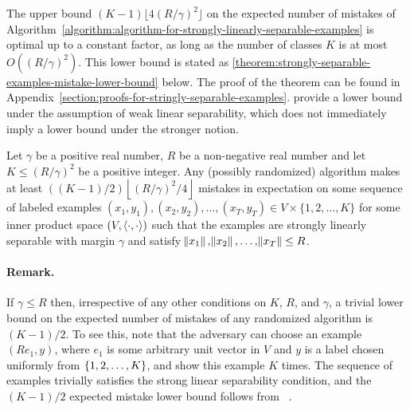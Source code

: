 The upper bound $(K-1) \lfloor 4(R/\gamma)^2 \rfloor$ on the expected number of
mistakes of
Algorithm~\ref{algorithm:algorithm-for-strongly-linearly-separable-examples} is
optimal up to a constant factor, as long as the number of classes $K$ is at most
$O((R/\gamma)^2)$. This lower bound is stated as
\autoref{theorem:strongly-separable-examples-mistake-lower-bound} below. The
proof of the theorem can be found in
Appendix~\ref{section:proofs-for-stringly-separable-examples}.
\citet{Daniely-Helbertal-2013} provide a lower bound
under the assumption of weak linear separability, which does not immediately
imply a lower bound under the stronger notion.

\begin{theorem}
\label{theorem:strongly-separable-examples-mistake-lower-bound}
Let $\gamma$ be a positive real number, $R$ be a non-negative real number and
let $K \le (R/\gamma)^2$ be a positive integer. Any (possibly randomized)
algorithm makes at least $((K-1)/2)\left\lfloor (R/\gamma)^2/4 \right\rfloor$
mistakes in expectation on some sequence of labeled examples $(x_1, y_1),
(x_2, y_2), \dots, (x_T, y_T) \in V \times \{1,2,\dots,K\}$ for some inner
product space $(V, \left\langle \cdot, \cdot \right\rangle)$ such that the examples are strongly
linearly separable with margin $\gamma$ and satisfy $\norm{x_1}, \norm{x_2},
\dots, \norm{x_T} \le R$.
\end{theorem}

\paragraph{Remark.}
If $\gamma \le R$ then, irrespective of any other conditions on $K$, $R$, and
$\gamma$, a trivial lower bound on the expected number of mistakes of any
randomized algorithm is $(K-1)/2$. To see this, note that the adversary can
choose an example $(R e_1, y)$, where $e_1$ is some arbitrary unit vector in $V$
and $y$ is a label chosen uniformly from $\cbr{1,2,\dots,K}$, and show this
example $K$ times. The sequence of examples trivially satisfies the strong
linear separability condition, and the $(K-1)/2$ expected mistake lower bound
follows from ~\citep[][Claim 2]{Daniely-Helbertal-2013}. %

